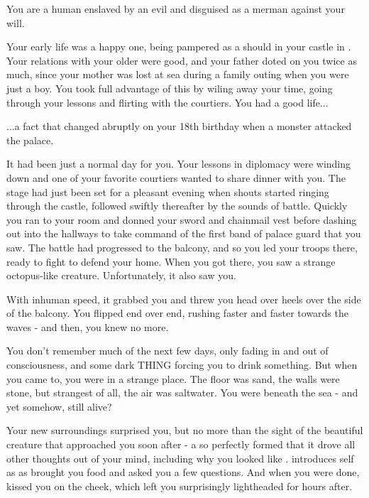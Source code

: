 \documentclass[char]{NeptuneBall}
\begin{document}
\name{\cSlave{}}

You are a human \cSlave{\Prince} enslaved by an evil \cWitch{\magician} and disguised as a merman against your will.

Your early life was a happy one, being pampered as a \cSlave{\Prince} should in your castle in \pAmerica{}. Your relations with your older \cEric{\sibling} were good, and your father doted on you twice as much, since your mother was lost at sea during a family outing when you were just a boy. You took full advantage of this by wiling away your time, going through your lessons and flirting with the courtiers. You had a good life...

...a fact that changed abruptly on your 18th birthday when a monster attacked the palace.

It had been just a normal day for you. Your lessons in diplomacy were winding down and one of your favorite courtiers wanted to share dinner with you. The stage had just been set for a pleasant evening when shouts started ringing through the castle, followed swiftly thereafter by the sounds of battle. Quickly you ran to your room and donned your sword and chainmail vest before dashing out into the hallways to take command of the first band of palace guard that you saw. The battle had progressed to the balcony, and so you led your troops there, ready to fight to defend your home. When you got there, you saw a strange octopus-like creature. Unfortunately, it also saw you.

With inhuman speed, it grabbed you and threw you head over heels over the side of the balcony. You flipped end over end, rushing faster and faster towards the waves - and then, you knew no more.

You don't remember much of the next few days, only fading in and out of consciousness, and some dark THING forcing you to drink something. But when you came to, you were in a strange place. The floor was sand, the walls were stone, but strangest of all, the air was saltwater. You were beneath the sea - and yet somehow, still alive?

Your new surroundings surprised you, but no more than the sight of the beautiful creature that approached you soon after - a \cWitch{\mer} so perfectly formed that it drove all other thoughts out of your mind, including why you looked like \cWitch{\they}. \cWitch{\They} introduces \cWitch{\their}self as \cWitch{} as \cWitch{\they} brought you food and asked you a few questions. And when you were done, \cWitch{\they} kissed you on the cheek, which left you surprisingly lightheaded for hours after.
\end{document}
